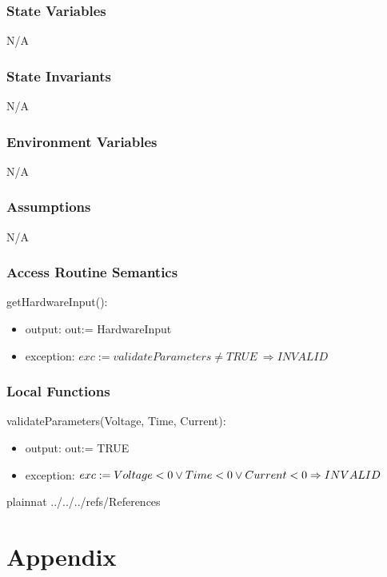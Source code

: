 \documentclass[12pt, titlepage]{article}
\begin{document}
\subsubsection{State Variables}
N/A

\subsubsection{State Invariants}
N/A

\subsubsection{Environment Variables}

N/A

\subsubsection{Assumptions}
N/A

\subsubsection{Access Routine Semantics}

\noindent getHardwareInput():
\begin{itemize}
\item output: out:= HardwareInput
\item exception: $exc:= 
validateParameters \ne TRUE \
\Rightarrow INVALID$
\end{itemize}


\subsubsection{Local Functions}
\noindent validateParameters(Voltage, Time, Current):
\begin{itemize}
\item output: out:= TRUE
\item exception: $exc:= 
Voltage < 0 \lor \\
Time < 0 \lor Current < 0 \\
\Rightarrow INVALID$
\end{itemize}
\newpage

 {plainnat}
 {../../../refs/References}

\newpage

\section{Appendix} \label{Appendix}

\end{document}
